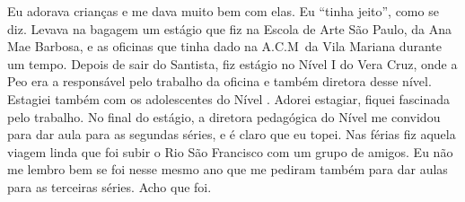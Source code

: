 Eu adorava crianças e me dava muito bem com elas. Eu ``tinha jeito'',
como se diz. Levava na bagagem um estágio que fiz na Escola de Arte São
Paulo, da Ana Mae Barbosa, e as oficinas que tinha dado na A.C.M\, da
Vila Mariana durante um tempo. Depois de sair do Santista, fiz estágio
no Nível I do Vera Cruz, onde a Peo era a responsável pelo trabalho da
oficina e também diretora desse nível. Estagiei também com os
adolescentes do Nível . Adorei estagiar, fiquei fascinada pelo
trabalho. No final do estágio, a diretora pedagógica do Nível  me
convidou para dar aula para as segundas séries, e é claro que eu topei.
Nas férias fiz aquela viagem linda que foi subir o Rio São Francisco com
um grupo de amigos. Eu não me lembro bem se foi nesse mesmo ano que me
pediram também para dar aulas para as terceiras séries. Acho que foi.

